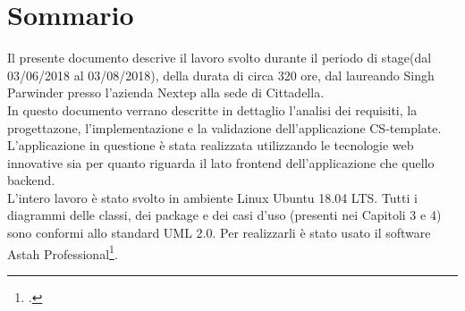 
\cleardoublepage
{}
{}
\begingroup
\let\clearpage\relax
\let\cleardoublepage\relax
\let\cleardoublepage\relax

\chapter*{Sommario}
Il presente documento descrive il lavoro svolto durante il periodo di stage(dal 03/06/2018 al 03/08/2018), della durata di circa 320 ore, dal laureando Singh Parwinder presso l'azienda Nextep alla sede di Cittadella.
\\
In questo documento verrano descritte in dettaglio l'analisi dei requisiti, la progettazone, l'implementazione e la validazione dell'applicazione CS-template. L'applicazione in questione è stata realizzata utilizzando le tecnologie web innovative sia per quanto riguarda il lato frontend dell'applicazione che quello backend.\\
L'intero lavoro è stato svolto in ambiente Linux Ubuntu 18.04 LTS. Tutti i diagrammi delle classi, dei package e dei casi d’uso (presenti nei Capitoli 3 e
4) sono conformi allo standard UML 2.0. Per realizzarli è stato usato il software Astah
Professional\footcite{http://astah.net/editions/professional}.  

%
%


